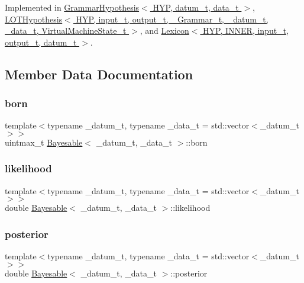 Implemented in \hyperlink{class_grammar_hypothesis_a55ee98de75a30cea35fdaf62ccf14a90}{Grammar\+Hypothesis$<$ H\+Y\+P, datum\+\_\+t, data\+\_\+t $>$}, \hyperlink{class_l_o_t_hypothesis_acda322aef217a0d358ae6cea19969904}{L\+O\+T\+Hypothesis$<$ H\+Y\+P, input\+\_\+t, output\+\_\+t, \+\_\+\+Grammar\+\_\+t, \+\_\+datum\+\_\+t, \+\_\+data\+\_\+t, Virtual\+Machine\+State\+\_\+t $>$}, and \hyperlink{class_lexicon_a5c584d2885a21542082332a26eb0961b}{Lexicon$<$ H\+Y\+P, I\+N\+N\+E\+R, input\+\_\+t, output\+\_\+t, datum\+\_\+t $>$}.



\subsection{Member Data Documentation}
\mbox{\label{class_bayesable_a898e03a20e1851c868b77ef4e844f0bf}} 
\subsubsection{\texorpdfstring{born}{born}}
{\footnotesize\ttfamily template$<$typename \+\_\+datum\+\_\+t, typename \+\_\+data\+\_\+t = std\+::vector$<$\+\_\+datum\+\_\+t$>$$>$ \\
uintmax\+\_\+t \hyperlink{class_bayesable}{Bayesable}$<$ \+\_\+datum\+\_\+t, \+\_\+data\+\_\+t $>$\+::born}

\mbox{\label{class_bayesable_a4d1a9ed826013bf079cea1867b6d4183}} 
\subsubsection{\texorpdfstring{likelihood}{likelihood}}
{\footnotesize\ttfamily template$<$typename \+\_\+datum\+\_\+t, typename \+\_\+data\+\_\+t = std\+::vector$<$\+\_\+datum\+\_\+t$>$$>$ \\
double \hyperlink{class_bayesable}{Bayesable}$<$ \+\_\+datum\+\_\+t, \+\_\+data\+\_\+t $>$\+::likelihood}

\mbox{\label{class_bayesable_a268442b9aae5b763c17ca29c39231915}} 
\subsubsection{\texorpdfstring{posterior}{posterior}}
{\footnotesize\ttfamily template$<$typename \+\_\+datum\+\_\+t, typename \+\_\+data\+\_\+t = std\+::vector$<$\+\_\+datum\+\_\+t$>$$>$ \\
double \hyperlink{class_bayesable}{Bayesable}$<$ \+\_\+datum\+\_\+t, \+\_\+data\+\_\+t $>$\+::posterior}

